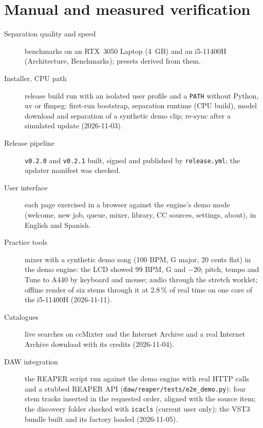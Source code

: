 \documentclass{covermaker}
\begin{document}
\section{Manual and measured verification}
\begin{description}
  \item[Separation quality and speed] benchmarks on an RTX~3050 Laptop (4~GB)
  and an i5-11400H (Architecture, Benchmarks); presets derived from them.
  \item[Installer, CPU path] release build run with an isolated user profile
  and a \texttt{PATH} without Python, uv or ffmpeg: first-run bootstrap,
  separation runtime (CPU build), model download and separation of a
  synthetic demo clip; re-sync after a simulated update (2026-11-03).
  \item[Release pipeline] \texttt{v0.2.0} and \texttt{v0.2.1} built, signed and
  published by \texttt{release.yml}; the updater manifest was checked.
  \item[User interface] each page exercised in a browser against the engine's
  demo mode (welcome, new job, queue, mixer, library, CC sources, settings,
  about), in English and Spanish.
  \item[Practice tools] mixer with a synthetic demo song (100 BPM, G major,
  20 cents flat) in the demo engine: the LCD showed 99 BPM, G and $-20$; pitch,
  tempo and Tune to A440 by keyboard and mouse; audio through the stretch
  worklet; offline render of six stems through it at 2.8\,\% of real time on
  one core of the i5-11400H (2026-11-11).
  \item[Catalogues] live searches on ccMixter and the Internet Archive and a
  real Internet Archive download with its credits (2026-11-04).
  \item[DAW integration] the REAPER script run against the demo engine with
  real HTTP calls and a stubbed REAPER API
  (\texttt{daw/reaper/tests/e2e\_demo.py}): four stem tracks inserted in the
  requested order, aligned with the source item; the discovery folder checked
  with \texttt{icacls} (current user only); the VST3 bundle built and its
  factory loaded (2026-11-05).
\end{description}
\end{document}
